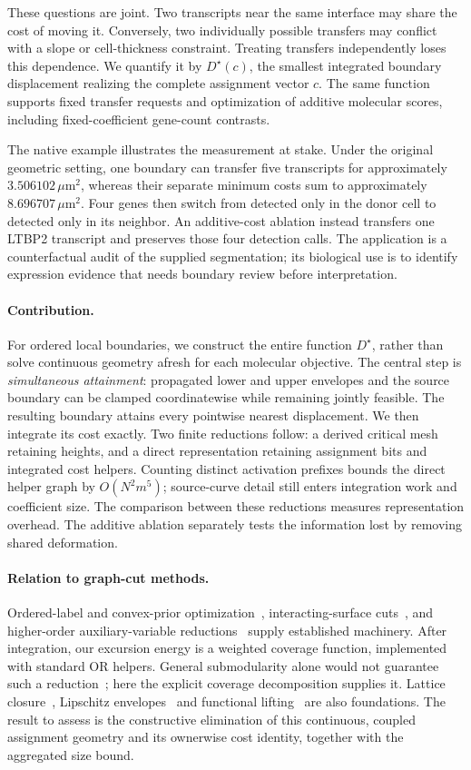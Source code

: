 \documentclass[10pt,letterpaper]{article}
\begin{document}
These questions are joint. Two transcripts near the same interface may share the cost of moving it. Conversely, two individually possible transfers may conflict with a slope or cell-thickness constraint. Treating transfers independently loses this dependence. We quantify it by $D^\star(c)$, the smallest integrated boundary displacement realizing the complete assignment vector $c$. The same function supports fixed transfer requests and optimization of additive molecular scores, including fixed-coefficient gene-count contrasts.

The native example illustrates the measurement at stake. Under the original geometric setting, one boundary can transfer five transcripts for approximately $3.506102\,\mu$m$^2$, whereas their separate minimum costs sum to approximately $8.696707\,\mu$m$^2$. Four genes then switch from detected only in the donor cell to detected only in its neighbor. An additive-cost ablation instead transfers one LTBP2 transcript and preserves those four detection calls. The application is a counterfactual audit of the supplied segmentation; its biological use is to identify expression evidence that needs boundary review before interpretation.

\paragraph{Contribution.}
For ordered local boundaries, we construct the entire function $D^\star$, rather than solve continuous geometry afresh for each molecular objective. The central step is \emph{simultaneous attainment}: propagated lower and upper envelopes and the source boundary can be clamped coordinatewise while remaining jointly feasible. The resulting boundary attains every pointwise nearest displacement. We then integrate its cost exactly. Two finite reductions follow: a derived critical mesh retaining heights, and a direct representation retaining assignment bits and integrated cost helpers. Counting distinct activation prefixes bounds the direct helper graph by $O(N^2m^5)$; source-curve detail still enters integration work and coefficient size. The comparison between these reductions measures representation overhead. The additive ablation separately tests the information lost by removing shared deformation.

\paragraph{Relation to graph-cut methods.}
Ordered-label and convex-prior optimization~\cite{ishikawa,hochbaum}, interacting-surface cuts~\cite{li,shah}, and higher-order auxiliary-variable reductions~\cite{kz,kohli} supply established machinery. After integration, our excursion energy is a weighted coverage function, implemented with standard OR helpers. General submodularity alone would not guarantee such a reduction~\cite{zivny}; here the explicit coverage decomposition supplies it. Lattice closure~\cite{felsner}, Lipschitz envelopes~\cite{petrakis,agarwal} and functional lifting~\cite{pock} are also foundations. The result to assess is the constructive elimination of this continuous, coupled assignment geometry and its ownerwise cost identity, together with the aggregated size bound.
\end{document}
